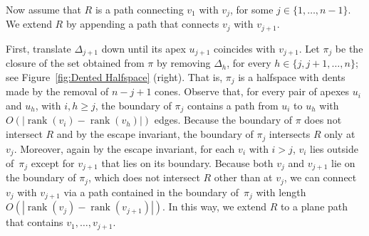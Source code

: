 \documentclass[11pt]{patmorin}
\DeclareMathOperator{\rank}{rank}
\begin{document}
Now assume that $R$ is a path connecting $v_1$ with $v_j$, for some $j\in \{1,\dots,n-1\}$. We extend $R$ by appending a
path that connects $v_j$ with $v_{j+1}$.

First, translate $\Delta_{j+1}$ down until its apex $u_{j+1}$ coincides with $v_{j+1}$. Let $\pi_j$ be the closure of the set obtained from $\pi$ by removing $\Delta_h$, for every $h\in\{j,j+1,\ldots,n\}$; see Figure~\ref{fig:Dented Halfspace} (right). That is, $\pi_j$ is a halfspace with dents made by the removal of $n-j+1$ cones.
Observe that, for every pair of apexes $u_i$ and $u_h$, with $i,h\geq j$, the boundary of $\pi_j$
contains a path from $u_i$ to $u_h$ with $O(|\rank(v_i)-\rank(v_h)|)$ edges.
Because the boundary of $\pi$ does not intersect $R$ and by the escape invariant, the boundary of $\pi_j$ intersects $R$ only at $v_j$. Moreover, again by the escape invariant, for each $v_i$ with $i > j$, $v_i$ lies outside of~$\pi_j$ except for $v_{j+1}$ that lies on its boundary. Because both $v_j$ and $v_{j+1}$ lie on the boundary of $\pi_j$, which does not intersect $R$ other than at $v_j$, we can connect $v_j$ with $v_{j+1}$ via a path contained in the boundary of~$\pi_j$ with length $O(|\rank(v_j) - \rank(v_{j+1})|)$. In this way, we extend $R$ to a plane path that contains $v_1,\ldots,v_{j+1}$.
\end{document}
